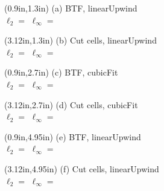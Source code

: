 \documentclass{article}
\begin{document}
\TPMargin{1pt}
\begin{textblock*}{12em}(0.9in,1.3in)
\normalsize
(a) BTF, linearUpwind \\
\hspace*{0.3em}$\ell_2 = $
\hspace*{1em}$\ell_\infty = $
\end{textblock*}

\begin{textblock*}{12em}(3.12in,1.3in)
\normalsize
(b) Cut cells, linearUpwind \\
\hspace*{0.3em}$\ell_2 = $
\hspace*{1em}$\ell_\infty = $
\end{textblock*}

\begin{textblock*}{12em}(0.9in,2.7in)
\normalsize
(c) BTF, cubicFit \\
\hspace*{0.3em}$\ell_2 = $
\hspace*{1em}$\ell_\infty = $
\end{textblock*}

\begin{textblock*}{12em}(3.12in,2.7in)
\normalsize
(d) Cut cells, cubicFit \\
\hspace*{0.3em}$\ell_2 = $
\hspace*{1em}$\ell_\infty = $
\end{textblock*}

\begin{textblock*}{12em}(0.9in,4.95in)
\normalsize
(e) BTF, linearUpwind \\
\hspace*{0.3em}$\ell_2 = $
\hspace*{1em}$\ell_\infty = $
\end{textblock*}

\begin{textblock*}{12em}(3.12in,4.95in)
\normalsize
(f) Cut cells, linearUpwind \\
\hspace*{0.3em}$\ell_2 = $
\hspace*{1em}$\ell_\infty = $
\end{textblock*}
\end{document}
